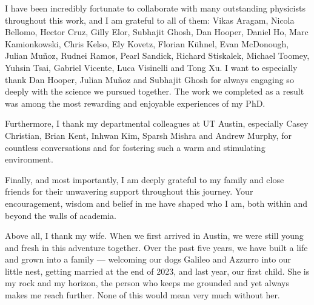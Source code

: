 \begin{acknowledgments}
I have been incredibly fortunate to collaborate with many outstanding physicists throughout this work, and I am grateful to all of them: Vikas Aragam, Nicola Bellomo, Hector Cruz, Gilly Elor, Subhajit Ghosh, Dan Hooper, Daniel Ho, Marc Kamionkowski, Chris Kelso, Ely Kovetz, Florian K\"{u}hnel, Evan McDonough, Julian Mu\~{n}oz, Rudnei Ramos, Pearl Sandick, Richard Stiskalek, Michael Toomey, Yuhsin Tsai, Gabriel Vicente, Luca Visinelli and Tong Xu. I want to especially thank Dan Hooper, Julian Mu\~{n}oz and Subhajit Ghosh for always engaging so deeply with the science we pursued together. The work we completed as a result was among the most rewarding and enjoyable experiences of my PhD.

Furthermore, I thank my departmental colleagues at UT Austin, especially Casey Christian, Brian Kent, Inhwan Kim, Sparsh Mishra and  Andrew Murphy, for countless conversations and for fostering such a warm and stimulating environment.

Finally, and most importantly, I am deeply grateful to my family and close friends for their unwavering support throughout this journey. Your encouragement, wisdom and belief in me have shaped who I am, both within and beyond the walls of academia.

Above all, I thank my wife. When we first arrived in Austin, we were still young and fresh in this adventure together. Over the past five years, we have built a life and grown into a family --- welcoming our dogs Galileo and Azzurro into our little nest, getting married at the end of 2023, and last year, our first child. She is my rock and my horizon, the person who keeps me grounded and yet always makes me reach further. None of this would mean very much without her.
\end{acknowledgments}

\utabstract


\tableofcontents   %

\listoftables      %
\listoffigures     %




\pagestyle{fancy}



